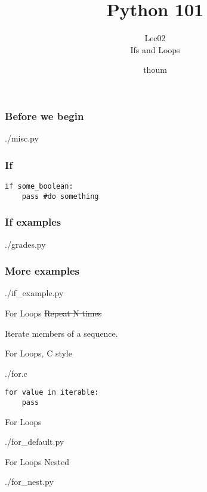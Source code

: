 \documentclass{beamer}
\title{Python 101}
\subtitle{Lec02 \\ Ifs and Loops}
\author{thoum}
\begin{document}
\frame{\titlepage}

\begin{frame}[fragile]
\frametitle{Before we begin}
  \begin{lstinputlisting}
    {./misc.py}
  \end{lstinputlisting}
\end{frame}

\begin{frame}[fragile]
\frametitle{If}
\begin{lstlisting}
if some_boolean:
    pass #do something
\end{lstlisting}
\end{frame}

\begin{frame}
\frametitle{If examples}
  \begin{lstinputlisting}
    {./grades.py}
  \end{lstinputlisting}
\end{frame}

\begin{frame}
\frametitle{More examples}
  \begin{lstinputlisting}
    {./if_example.py}
  \end{lstinputlisting}
\end{frame}

\begin{frame}{For Loops}
  \sout{Repeat N times}

  Iterate members of a sequence.
\end{frame}

\begin{frame}{For Loops, C style}
  \begin{lstinputlisting}
    {./for.c}
  \end{lstinputlisting}
\end{frame}

\begin{frame}[fragile]
  \begin{lstlisting}
for value in iterable:
    pass
  \end{lstlisting}
\end{frame}

\begin{frame}{For Loops}
  \begin{lstinputlisting}
    {./for_default.py}
  \end{lstinputlisting}
\end{frame}

\begin{frame}{For Loops Nested}
  \begin{lstinputlisting}
    {./for_nest.py}
  \end{lstinputlisting}
\end{frame}
\end{document}
